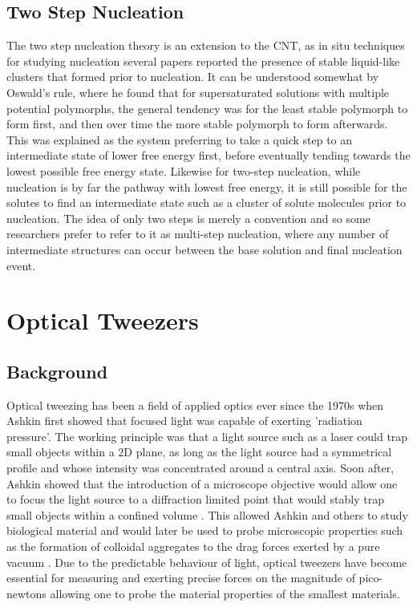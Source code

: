 \documentclass[a4paper,oneside,11pt]{book}
\begin{document}
\subsection{Two Step Nucleation}
The two step nucleation theory is an extension to the CNT, as in situ techniques for studying nucleation several papers reported the presence of stable liquid-like clusters that formed prior to nucleation.  It can be understood somewhat by Oswald's rule, where he found that for supersaturated solutions with multiple potential polymorphs, the general tendency was for the least stable polymorph to form first, and then over time the more stable polymorph to form afterwards. This was explained as the system preferring to take a quick step to an intermediate state of lower free energy first, before eventually tending towards the lowest possible free energy state. Likewise for two-step nucleation, while nucleation is by far the pathway with lowest free energy, it is still possible for the solutes to find an intermediate state such as a cluster of solute molecules prior to nucleation. The idea of only two steps is merely a convention and so some researchers prefer to refer to it as multi-step nucleation, where any number of intermediate structures can occur between the base solution and final nucleation event.  

\section{Optical Tweezers}
\subsection{Background}
Optical tweezing has been a field of applied optics ever since the 1970s when Ashkin \cite{Ashkin1970} first showed that focused light was capable of exerting 'radiation pressure'. The working principle was that a light source such as a laser could trap small objects within a 2D plane, as long as the light source had a symmetrical profile and whose intensity was concentrated around a central axis. Soon after, Ashkin showed that the introduction of a microscope objective would allow one to focus the light source to a diffraction limited point that would stably trap small objects within a confined volume \cite{Ashkin1980}. This allowed Ashkin and others to study biological material and would later be used to probe microscopic properties such as the formation of colloidal aggregates \cite{Yi2021} to the drag forces exerted by a pure vacuum \cite{Ahn2018, Monteiro2018}. Due to the predictable behaviour of light, optical tweezers have become essential for measuring and exerting precise forces on the magnitude of pico-newtons allowing one to probe the material properties of the smallest materials. 
\end{document}
